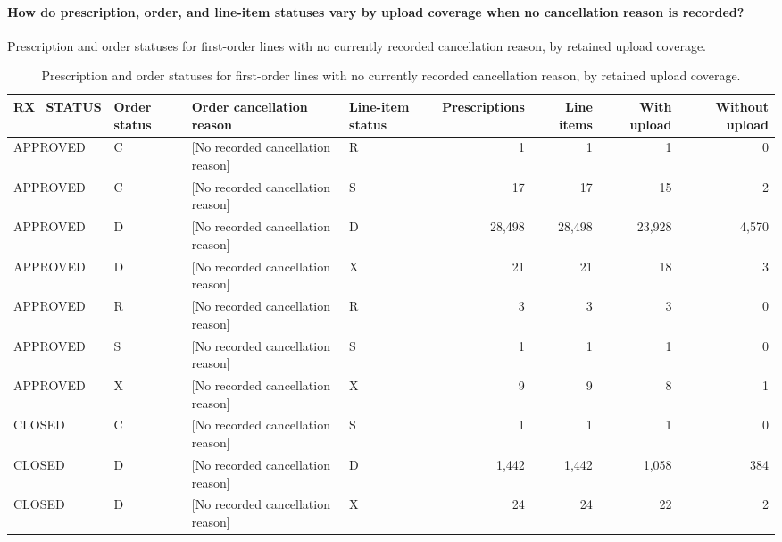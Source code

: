 \begin{landscape}
\paragraph{How do prescription, order, and line-item statuses vary by upload coverage when no cancellation reason is recorded?}
Prescription and order statuses for first-order lines with no currently recorded cancellation reason, by retained upload coverage.

\begin{table}[htbp]
\centering
\caption{Prescription and order statuses for first-order lines with no currently recorded cancellation reason, by retained upload coverage.}
\label{tab:study-no-cancellation-upload-details}
\small
\setlength{\tabcolsep}{6pt}
\begin{tabular}{llllrrrr}
\toprule
RX\_STATUS & Order status & Order cancellation reason & Line-item status & Prescriptions & Line items & With upload & Without upload \\
\midrule

APPROVED & C & [No recorded cancellation reason] & R & 1 & 1 & 1 & 0 \\

APPROVED & C & [No recorded cancellation reason] & S & 17 & 17 & 15 & 2 \\

APPROVED & D & [No recorded cancellation reason] & D & 28,498 & 28,498 & 23,928 & 4,570 \\

APPROVED & D & [No recorded cancellation reason] & X & 21 & 21 & 18 & 3 \\

APPROVED & R & [No recorded cancellation reason] & R & 3 & 3 & 3 & 0 \\

APPROVED & S & [No recorded cancellation reason] & S & 1 & 1 & 1 & 0 \\

APPROVED & X & [No recorded cancellation reason] & X & 9 & 9 & 8 & 1 \\

CLOSED & C & [No recorded cancellation reason] & S & 1 & 1 & 1 & 0 \\

CLOSED & D & [No recorded cancellation reason] & D & 1,442 & 1,442 & 1,058 & 384 \\

CLOSED & D & [No recorded cancellation reason] & X & 24 & 24 & 22 & 2 \\


\end{tabular}
\end{table}
\end{landscape}
